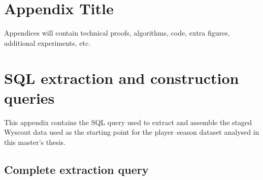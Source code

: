 \documentclass{fmetfm}
\begin{document}
\chapter{Appendix Title}
Appendices will contain technical proofs, algorithms, code, extra figures, additional experiments, etc.

\chapter{SQL extraction and construction queries}

This appendix contains the SQL query used to extract and assemble the staged Wyscout data used as the starting point for the player--season dataset analysed in this master's thesis.

\section{Complete extraction query}






\end{document}
